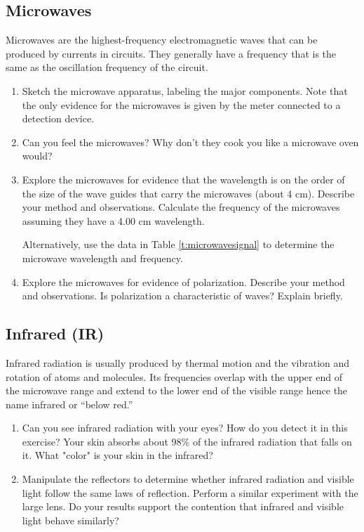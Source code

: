 \subsection{Microwaves}
Microwaves are the highest-frequency electromagnetic waves that can be produced by currents in circuits.  They generally have a frequency that is the same as the oscillation frequency of the circuit.

\begin{enumerate}
	\item Sketch the microwave apparatus, labeling the major components.  Note that the only evidence for the microwaves is given by the meter connected to a detection device.
	\item Can you feel the microwaves?  Why don't they cook you like a microwave oven would?
	\item Explore the microwaves for evidence that the wavelength is on the order of the size of the wave guides that carry the microwaves (about 4 cm).  Describe your method and observations.  Calculate the frequency of the microwaves assuming they have a 4.00 cm wavelength. \par
	Alternatively, use the data in Table \ref{t:microwavesignal} to determine the microwave wavelength and frequency.
	\item Explore the microwaves for evidence of polarization.  Describe your method and observations.  Is polarization a characteristic of waves?  Explain briefly.
\end{enumerate}
	
\subsection{Infrared (IR)}
Infrared radiation is usually produced by thermal motion and the vibration and rotation of atoms and molecules.  Its frequencies overlap with the upper end of the microwave range and extend to the lower end of the visible range hence the name infrared or ``below red.''
\begin{enumerate}
	\item Can you see infrared radiation with your eyes?  How do you detect it in this exercise?  Your skin absorbs about 98\% of the infrared radiation that falls on it.  What "color" is your skin in the infrared?
	\item Manipulate the reflectors to determine whether infrared radiation and visible light follow the same laws of reflection.  Perform a similar experiment with the large lens.  Do your results support the contention that infrared and visible light behave similarly?
\end{enumerate}
	
